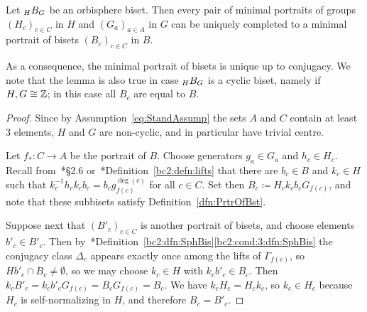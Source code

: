 \documentclass{amsart}
\begin{document}
\begin{lem}\label{lem:CritPortrUnique}
  Let $\subscript H B_G$ be an orbisphere biset. Then every pair of
  minimal portraits of groups $(H_c)_{c\in C}$ in $H$ and
  $(G_a)_{a\in A}$ in $G$ can be uniquely completed to a minimal
  portrait of bisets $(B_c)_{c\in C}$ in $B$.
\end{lem}
As a consequence, the minimal portrait of bisets is unique up to
conjugacy.  We note that the lemma is also true in case
$\subscript H B_G$ is a cyclic biset, namely if $H,G\cong{\mathbb Z}$; in this
case all $B_c$ are equal to $B$.
\begin{proof}
  Since by Assumption~\eqref{eq:StandAssump} the sets $A$ and $C$
  contain at least $3$ elements, $H$ and $G$ are non-cyclic, and in
  particular have trivial centre.

  Let $f_*\colon C\to A$ be the portrait of $B$. Choose generators
  $g_a\in G_a$ and $h_c\in H_c$.  Recall
  from~\cite{bartholdi-dudko:bc1}*{\S2.6}
  or~\cite{bartholdi-dudko:bc2}*{Definition~\ref{bc2:defn:lifts}} that
  there are $b_c\in B$ and $k_c \in H$ such that
  $k_c^{-1}h_c k_c b_c = b_c g_{f(c)}^{\deg(c)}$ for all $c\in C$. Set
  then $B_c\coloneqq H_c k_c b_c G_{f(c)}$, and note that these
  subbisets satisfy Definition~\ref{dfn:PrtrOfBst}.

  Suppose next that $(B'_c)_{c\in C}$ is another portrait of bisets,
  and choose elements $b'_c\in B'_c$. Then
  by~\cite{bartholdi-dudko:bc2}*{Definition~\ref{bc2:dfn:SphBis}\eqref{bc2:cond:3:dfn:SphBis}}
  the conjugacy class $\Delta_c$ appears exactly once among the lifts
  of $\Gamma_{f(c)}$, so $H b'_c\cap B_c\neq\emptyset$, so we may
  choose $k_c\in H$ with $k_c b'_c\in B_c$. Then
  $k_c B'_c = k_c b'_c G_{f(c)} = B_c G_{f(c)} = B_c$. We have
  $k_c H_c= H_c k_c$, so $k_c\in H_c$ because $H_c$ is
  self-normalizing in $H$, and therefore $B_c=B'_c$.
\end{proof}
\end{document}
